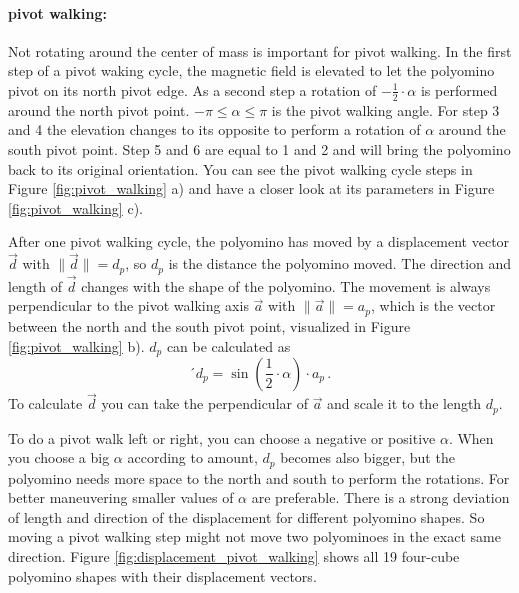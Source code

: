 \paragraph{pivot walking:}
Not rotating around the center of mass is important for pivot walking.
In the first step of a pivot waking cycle, the magnetic field is elevated to let the polyomino pivot on its north pivot edge.
As a second step a rotation of $-\frac{1}{2} \cdot \alpha$ is performed around the north pivot point.
$-\pi \leq \alpha \leq \pi$ is the pivot walking angle.
For step 3 and 4 the elevation changes to its opposite to perform a rotation of $\alpha$ around the south pivot point.
Step 5 and 6 are equal to 1 and 2 and will bring the polyomino back to its original orientation.
You can see the pivot walking cycle steps in Figure \ref{fig:pivot_walking} a) and have a closer look at its parameters in Figure \ref{fig:pivot_walking} c).

After one pivot walking cycle, the polyomino has moved by a displacement vector $\vec{d}$ with $\lVert \vec{d} \rVert = d_p$, so $d_p$ is the distance the polyomino moved.
The direction and length of $\vec{d}$ changes with the shape of the polyomino.
The movement is always perpendicular to the pivot walking axis $\vec{a}$ with $\lVert \vec{a} \rVert = a_p$, which is the vector between the north and the south pivot point, visualized in Figure \ref{fig:pivot_walking} b).
$d_p$ can be calculated as
\begin{equation*}´
d_p = \sin\left(\frac{1}{2} \cdot \alpha \right) \cdot a_p \,.
\end{equation*}
To calculate $\vec{d}$ you can take the perpendicular of $\vec{a}$ and scale it to the length $d_p$.

To do a pivot walk left or right, you can choose a negative or positive $\alpha$.
When you choose a big $\alpha$ according to amount, $d_p$ becomes also bigger, but the polyomino needs more space to the north and south to perform the rotations.
For better maneuvering smaller values of $\alpha$ are preferable.
There is a strong deviation of length and direction of the displacement for different polyomino shapes.
So moving a pivot walking step might not move two polyominoes in the exact same direction.
Figure \ref{fig:displacement_pivot_walking} shows all 19 four-cube polyomino shapes with their displacement vectors.

